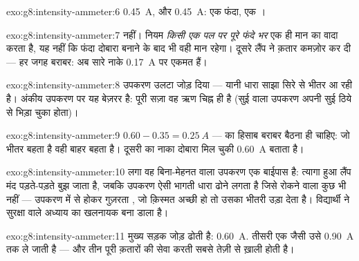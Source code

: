 \begin{solution}{exo:g8:intensity-ammeter:6}
\qty{0.45}{A}, और \qty{0.45}{A}: एक फंदा, एक ।
\end{solution}

\begin{solution}{exo:g8:intensity-ammeter:7}
नहीं। नियम \emph{किसी एक पल पर पूरे फंदे भर} एक ही मान का वादा करता
है, यह नहीं कि फंदा दोबारा बनाने के बाद भी वही मान रहेगा। दूसरे लैंप
ने क़तार कमज़ोर कर दी --- हर जगह बराबर: अब सारे नाके \qty{0.17}{A} पर
एकमत हैं।
\end{solution}

\begin{solution}{exo:g8:intensity-ammeter:8}
उपकरण उलटा जोड़ दिया --- यानी धारा साझा सिरे से भीतर आ रही है। अंकीय
उपकरण पर यह बेज़रर है: पूरी सज़ा वह ऋण चिह्न ही है (सुई वाला उपकरण
अपनी सुई ठिये से भिड़ा चुका होता)।
\end{solution}

\begin{solution}{exo:g8:intensity-ammeter:9}
$0.60 - 0.35 = \qty{0.25}{A}$ ---  का हिसाब बराबर बैठना ही चाहिए:
जो भीतर बहता है वही बाहर बहता है। दूसरी  का नाका दोबारा मिल चुकी
\qty{0.60}{A} बताता है।
\end{solution}

\begin{solution}{exo:g8:intensity-ammeter:10}
 लगा वह बिना-मेहनत वाला उपकरण एक बाईपास है: त्यागा हुआ लैंप
मंद पड़ते-पड़ते बुझ जाता है, जबकि उपकरण ऐसी भागती धारा ढोने लगता है
जिसे रोकने वाला कुछ भी नहीं --- उपकरण में से होकर गुज़रता ,
जो क़िस्मत अच्छी हो तो उसका भीतरी  उड़ा देता है। विद्यार्थी ने
सुरक्षा वाले अध्याय का खलनायक बना डाला है।
\end{solution}

\begin{solution}{exo:g8:intensity-ammeter:11}
मुख्य सड़क जोड़ ढोती है: \qty{0.60}{A}.  तीसरी एक जैसी 
उसे \qty{0.90}{A} तक ले जाती है --- और तीन पूरी क़तारों की सेवा करती
 सबसे तेज़ी से ख़ाली होती है।
\end{solution}

